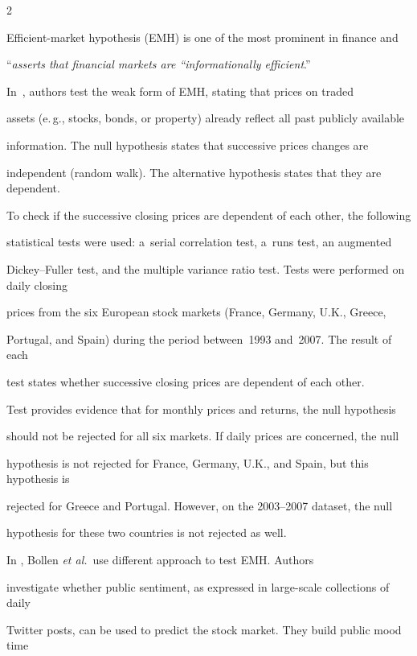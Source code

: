 \begin{multicols}{2}
\noindent


  Efficient-market hypothesis (EMH) is one of the most prominent in finance and


``\textit{asserts that financial markets are ``informationally efficient}.''


  In~\cite{75-kl}, authors test the weak form of EMH, stating that prices on traded


assets (e.\,g., stocks, bonds, or property) already reflect all past publicly available


information. The null hypothesis states that successive prices changes are


independent (random walk). The alternative hypothesis states that they are dependent.


To check if the successive closing prices are dependent of each other, the following


statistical tests were used: a~serial correlation test, a~runs test, an augmented


Dickey--Fuller test, and the multiple variance ratio test. Tests were performed on daily closing


prices from the six European stock markets (France, Germany, U.K., Greece,


Portugal, and Spain) during the period between~1993 and~2007. The result of each


test states whether successive closing prices are dependent of each other.





     Test provides evidence that for monthly prices and returns, the null hypothesis


should not be rejected for all six markets. If daily prices are concerned, the null


hypothesis is not rejected for France, Germany, U.K., and Spain, but this hypothesis is


rejected for Greece and Portugal. However, on the 2003--2007 dataset, the null


hypothesis for these two countries is not rejected as well.





  In \cite{76-kl}, Bollen \textit{et al.}\ use different approach to test EMH. Authors


investigate whether public sentiment, as expressed in large-scale collections of daily


Twitter posts, can be used to predict the stock market. They build public mood time



\end{multicols}
